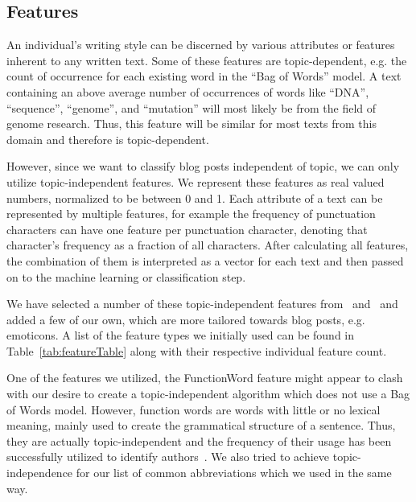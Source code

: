 \subsection{Features}
\label{sec:features}



An individual's writing style can be discerned by various attributes or features inherent to any written text.
Some of these features are topic-dependent, e.g. the count of occurrence for each existing word in the ``Bag of Words'' model.
A text containing an above average number of occurrences of words like ``DNA'', ``sequence'', ``genome'', and ``mutation'' will most likely be from the field of genome research.
Thus, this feature will be similar for most texts from this domain and therefore is topic-dependent.


However, since we want to classify blog posts independent of topic, we can only utilize topic-independent features.
We represent these features as real valued numbers, normalized to be between 0 and 1.
Each attribute of a text can be represented by multiple features, for example the frequency of punctuation characters can have one feature per punctuation character, denoting that character's frequency as a fraction of all characters.
After calculating all features, the combination of them is interpreted as a vector for each text and then passed on to the machine learning or classification step.


We have selected a number of these topic-independent features from~\cite{madigan2005author} and~\cite{narayanan2012feasibility} and added a few of our own, which are more tailored towards blog posts, e.g. emoticons.
A list of the feature types we initially used can be found in Table~\ref{tab:featureTable} along with their respective individual feature count.


One of the features we utilized, the FunctionWord feature might appear to clash with our desire to create a topic-independent algorithm which does not use a Bag of Words model.
However, function words are words with little or no lexical meaning, mainly used to create the grammatical structure of a sentence.
Thus, they are actually topic-independent and the frequency of their usage has been successfully utilized to identify authors~\cite{mosteller1962applied}.
We also tried to achieve topic-independence for our list of common abbreviations which we used in the same way.


